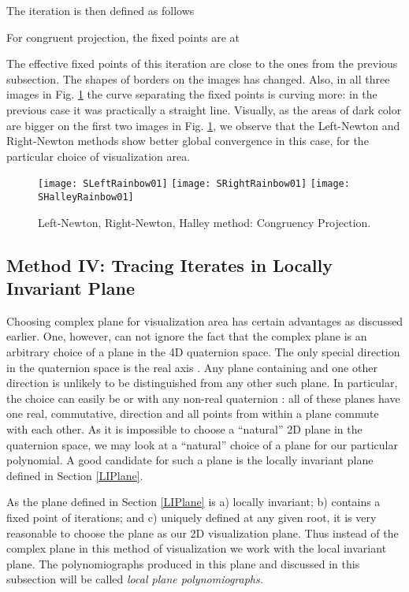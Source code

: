 \documentclass{article}
\theoremstyle{definition}
\begin{document}
The iteration is then defined as follows



For congruent projection, the fixed points are at

The effective fixed points of this iteration are close to the ones from the previous subsection. The shapes of borders on the images has changed. Also, in all three images in  Fig. \ref{leftComplexSpherical}  the curve separating the fixed points is curving more: in the previous case it was practically a straight line. Visually, as the areas of dark color are bigger on the first two images in Fig. \ref{leftComplexSpherical}, we observe that the Left-Newton and Right-Newton methods show better global convergence in this case, for the particular choice of visualization area.

\begin{figure}
\begin{center}
\texttt{[image: SLeftRainbow01]}
\texttt{[image: SRightRainbow01]}
\texttt{[image: SHalleyRainbow01]}
\caption{Left-Newton, Right-Newton, Halley method: Congruency Projection.}
\label{leftComplexSpherical}
\end{center}
\end{figure}


\subsection{Method IV: Tracing  Iterates in  Locally Invariant Plane}

Choosing complex plane for visualization area has certain advantages as discussed earlier. One, however, can not ignore the fact that the complex plane  is an arbitrary choice  of a plane in the 4D quaternion space. The only special direction in the quaternion space is the real axis . Any plane containing  and one other direction is unlikely to be distinguished from any other such plane. In particular, the choice  can easily be  or  with any non-real quaternion : all of these planes have one real, commutative, direction and all points from within a plane commute with each other. As it is impossible to choose a ``natural'' 2D plane in the quaternion space, we may look at a ``natural'' choice of a plane for our particular polynomial. A good candidate for such a plane is the locally invariant plane defined in Section \ref{LIPlane}.

As the plane defined in Section \ref{LIPlane} is a) locally invariant; b) contains a fixed point of iterations; and c) uniquely defined at any given root, it is very reasonable to choose the plane as our 2D visualization plane. Thus instead of the complex plane in this method of visualization we work with the local invariant plane. The polynomiographs produced in this plane and discussed in this subsection will be called {\it local plane polynomiographs.}
\end{document}
